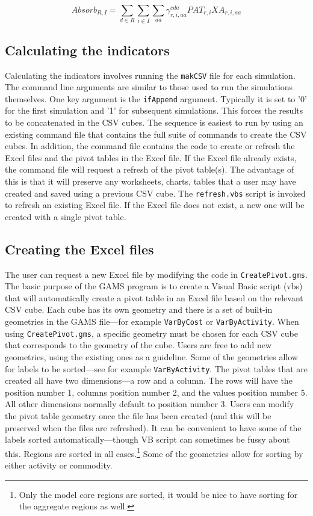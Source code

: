 \[
\mathit{Absorb}_{R,I} =
\sum_{d \in R} {\sum_{i \in I} {
		\sum_{\mathit{aa}}
		{\gamma^{\mathit{eda}}_{r,i,\mathit{aa}} \mathit{PAT}_{r,i} \mathit{XA}_{r,i,\mathit{aa}}
		}
}}
\]

\subsection{Calculating the indicators}

Calculating the indicators involves running the \texttt{makCSV} file for each simulation.
The command line arguments are similar to those used to run the simulations themselves.
One key argument is the \texttt{ifAppend} argument. Typically it is set to '0' for the
first simulation and '1' for subsequent simulations. This forces the results to
be concatenated in the CSV cubes. The sequence is easiest to run by using an existing
command file that contains the full suite of commands to create the CSV cubes.
In addition, the command file contains the code to create or refresh the Excel files
and the pivot tables in the Excel file. If the Excel file already exists, the
command file will request a refresh of the pivot table(s). The advantage of this is
that it will preserve any worksheets, charts, tables that a user may have created and
saved using a previous CSV cube. The \texttt{refresh.vbs} script is invoked
to refresh an existing Excel file. If the Excel file does not exist, a new one will be
created with a single pivot table.

\subsection{Creating the Excel files}
The user can request a new Excel file by modifying the code in \texttt{CreatePivot.gms}.
The basic purpose of the GAMS program is to create a Visual Basic script (vbs) that
will automatically create a pivot table in an Excel file based on the relevant
CSV cube. Each cube has its own geometry and there is a set of built-in
geometries in the GAMS file---for example \texttt{VarByCost} or \texttt{VarByActivity}.
When using \texttt{CreatePivot.gms}, a specific geometry must be chosen for each
CSV cube that corresponds to the geometry of the cube. Users are free to add new
geometries, using the existing ones as a guideline. Some of the geometries allow
for labels to be sorted---see for example \texttt{VarByActivity}. The pivot tables
that are created all have two dimensions---a row and a column. The rows will have
the position number 1, columns position number 2, and the values position number 5.
All other dimensions normally default to position number 3. Users can modify the
pivot table geometry once the file has been created (and this will be preserved when
the files are refreshed). It can be convenient to have some of the labels sorted
automatically---though VB script can sometimes be fussy about this. Regions are sorted
in all cases.\footnote{Only the model core regions are sorted, it would be nice to have
sorting for the aggregate regions as well.} Some of the geometries allow for
sorting by either activity or commodity.

